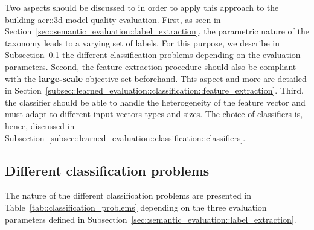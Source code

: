     Two aspects should be discussed to in order to apply this approach to the building \gls{acr::3d} model quality evaluation.
    First, as seen in Section~\ref{sec::semantic_evaluation::label_extraction}, the parametric nature of the taxonomy leads to a varying set of labels.
    For this purpose, we describe in Subsection~\ref{subsec::learned_evaluation::classification::different_porblems} the different classification problems depending on the evaluation parameters.
    Second, the feature extraction procedure should also be compliant with the \textbf{large-scale} objective set beforehand.
    This aspect and more are detailed in Section~\ref{subsec::learned_evaluation::classification::feature_extraction}.
    Third, the classifier should be able to handle the heterogeneity of the feature vector and must adapt to different input vectors types and sizes.
    The choice of classifiers is, hence, discussed in Subsection~\ref{subsec::learned_evaluation::classification::classifiers}.

    \subsection{Different classification problems}
        \label{subsec::learned_evaluation::classification::different_porblems}
        The nature of the different classification problems are presented in Table~\ref{tab::classification_problems} depending on the three evaluation parameters defined in Subsection~\ref{sec::semantic_evaluation::label_extraction}.\\


